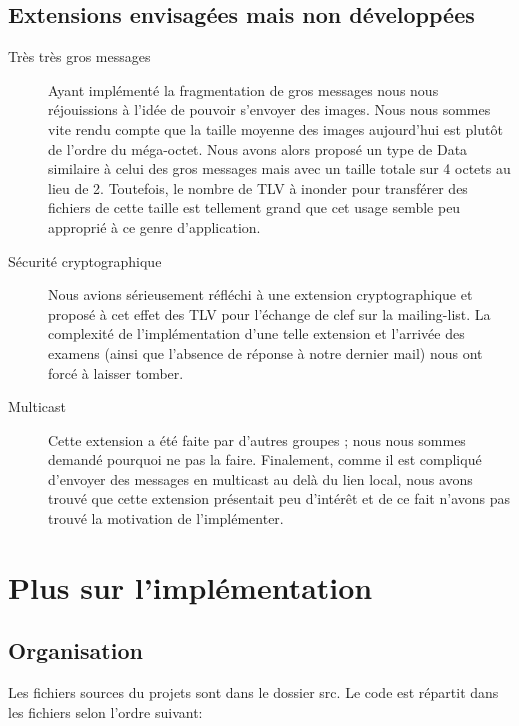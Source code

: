 \documentclass[a4paper,10pt]{article} %
\begin{document}
\subsection{Extensions envisagées mais non développées}

\begin{description}
\item[Très très gros messages] Ayant implémenté la fragmentation de gros messages nous nous réjouissions à l'idée de pouvoir s'envoyer des images. Nous nous sommes vite rendu compte que la taille moyenne des images aujourd'hui est plutôt de l'ordre du méga-octet. Nous avons alors proposé un type de Data similaire à celui des gros messages mais avec un taille totale sur 4 octets au lieu de 2. Toutefois, le nombre de TLV à inonder pour transférer des fichiers de cette taille est tellement grand que cet usage semble peu approprié à ce genre d'application.
\item[Sécurité cryptographique] Nous avions sérieusement réfléchi à une extension cryptographique et proposé à cet effet des TLV pour l'échange de clef sur la mailing-list. La complexité de l'implémentation d'une telle extension et l'arrivée des examens (ainsi que l'absence de réponse à notre dernier mail) nous ont forcé à laisser tomber.
\item[Multicast] Cette extension a été faite par d'autres groupes ; nous nous sommes demandé pourquoi ne pas la faire. Finalement, comme il est compliqué d'envoyer des messages en multicast au delà du lien local, nous avons trouvé que cette extension présentait peu d'intérêt et de ce fait n'avons pas trouvé la motivation de l'implémenter.
\end{description}

\section{Plus sur l'implémentation\label{sec:implem}}
\subsection{Organisation}

Les fichiers sources du projets sont dans le dossier \textrm{src}. Le code est répartit dans les fichiers selon l'ordre suivant:
\end{document}
